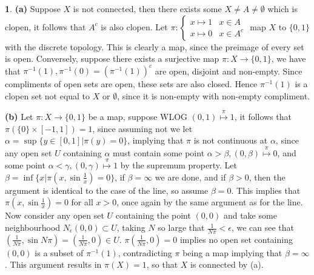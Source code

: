 \documentclass[10.5pt]{article}
\theoremstyle{definition}
\newtheorem{pb}{}
\newcommand{\set}[1]{\{#1\}}
\begin{document}
    \begin{pb}
        \textbf{(a)} Suppose \(X\) is not connected, then there exists some \(X \neq A \neq \emptyset\) which is clopen, it follows that
        \(A^c\) is also clopen. Let \(\pi: \begin{cases} x \mapsto 1 & x \in A \\ x \mapsto 0 &x\in A^c\end{cases}\) map \(X\) to \(\set{0,1}\) with the discrete topology.
        This is clearly a map, since the preimage of every set is open. Conversely, suppose there exists a surjective map \(\pi:X \to \set{0,1}\),
        we have that \(\pi^{-1}(1), \pi^{-1}(0) = (\pi^{-1}(1))^c\) are open, disjoint and non-empty. Since compliments of open sets are open, these sets are also closed.
        Hence \(\pi^{-1}(1)\) is a clopen set not equal to \(X\) or \(\emptyset\), since it is non-empty with non-empty compliment.

        \textbf{(b)} Let \(\pi:X\to \set{0,1}\) be a map, suppose WLOG \((0,1)\overset{\pi}{\mapsto}1\), it follows that \(\pi(\set{0}\times[-1,1]) = 1\), since
        assuming not we let \(\alpha = \sup\set{y \in [0,1]\vert \pi(y) = 0}\), implying that \(\pi\) is not continuous at \(\alpha\), since any open set
        \(U\) containing \(\alpha\) must contain some point \(\alpha > \beta, (0,\beta)\overset{\pi}{\mapsto}0\), and some point \(\alpha < \gamma, (0,\gamma)\overset{\pi}{\mapsto}1\) 
        by the supremum property. Let \(\beta = \inf \set{x\vert \pi(x,\sin\frac{1}{x}) = 0}\), if \(\beta=\infty\) we are done, and if \(\beta>0\), then the argument is
        identical to the case of the line, so assume \(\beta=0\). This implies that \(\pi(x,\sin \frac{1}{x}) = 0\) for all \(x > 0\), once again by the same argument
        as for the line. Now consider any open set \(U\) containing the point \((0,0)\) and take some neighbourhood \(N_\epsilon(0,0) \subset U\), taking
        \(N\) so large that \(\frac{1}{N\pi} < \epsilon\), we can see that \((\frac{1}{N\pi},\sin N\pi) = (\frac{1}{N\pi},0) \in U\). 
        \(\pi(\frac{1}{N\pi},0) = 0\) implies no open set containing \((0,0)\) is a subset of \(\pi^{-1}(1)\), contradicting \(\pi\) being a map implying that \(\beta = \infty\).
        This argument results in \(\pi(X) = 1\), so that \(X\) is connected by (a).


\end{pb}
\end{document}
